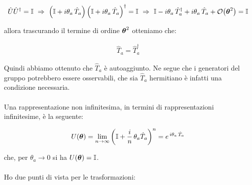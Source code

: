 \begin{align*}
	\hat{U} \hat{U}^{\dagger} = \mathbb{I} \,\, \Rightarrow \,\, \qty( \mathbb{I} + i \theta_a \, \hat{T}_a) \,  \qty( \mathbb{I} + i \theta_a \, \hat{T}_a) ^{\dagger} = \mathbb{I }  \,\, \Rightarrow \,\, \mathbb{I} - i \theta_a \, \hat{T}_a^{\dagger} + i \theta_a \, \hat{T}_a + \order{\vb*{\theta}^2}= \mathbb{I}
\end{align*}

	allora trascurando il termine di ordine $\vb*{\theta}^2$ otteniamo che:

\begin{align*} 
	\hat{T}_a = \hat{T}_a^{\dagger}
\end{align*}

	Quindi abbiamo ottenuto che $\hat{T}_a$ è autoaggiunto. Ne segue che i generatori del gruppo potrebbero essere osservabili, che sia $\hat{T}_a$ hermitiano è infatti una condizione necessaria.
	\\
	\\
	Una rappresentazione non infinitesima, in termini di rappresentazioni infinitesime, è la seguente:
	
\begin{align*}
	U(\vb*{\theta}) = \lim_{n \to \infty} \qty( \mathbb{I} + \frac{i}{n} \, \theta_a \hat{T}_a )^n = e^{\, i \theta_a \, \hat{T}_a}
\end{align*}

	che, per $\theta_a \to 0$ si ha $U(\vb*{\theta}) = \mathbb{I}$.
	\\
	\\
	Ho due punti di vista per le trasformazioni:
	
